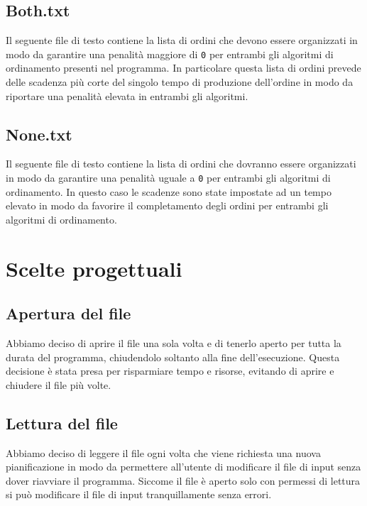 \documentclass[a4paper]{article}
\begin{document}
\subsection{Both.txt}
Il seguente file di testo contiene la lista di ordini che devono essere organizzati in
modo da garantire una penalità maggiore di \texttt{0} per entrambi gli algoritmi di
ordinamento presenti nel programma. In particolare questa lista di ordini prevede delle
scadenza più corte del singolo tempo di produzione dell'ordine in modo da riportare una
penalità elevata in entrambi gli algoritmi.
\subsection{None.txt}
Il seguente file di testo contiene la lista di ordini che dovranno essere organizzati in
modo da garantire una penalità uguale a \texttt{0} per entrambi gli algoritmi di
ordinamento. In questo caso le scadenze sono state impostate ad un tempo elevato in modo
da favorire il completamento degli ordini per entrambi gli algoritmi di ordinamento.

\section{Scelte progettuali}
\subsection{Apertura del file}
Abbiamo deciso di aprire il file una sola volta e di tenerlo aperto per tutta la durata
del programma, chiudendolo soltanto alla fine dell'esecuzione. Questa decisione è stata
presa per risparmiare tempo e risorse, evitando di aprire e chiudere il file più volte.

\subsection{Lettura del file}
Abbiamo deciso di leggere il file ogni volta che viene richiesta una nuova pianificazione
in modo da permettere all'utente di modificare il file di input senza dover riavviare il
programma. Siccome il file è aperto solo con permessi di lettura si può modificare il
file di input tranquillamente senza errori.
\end{document}
